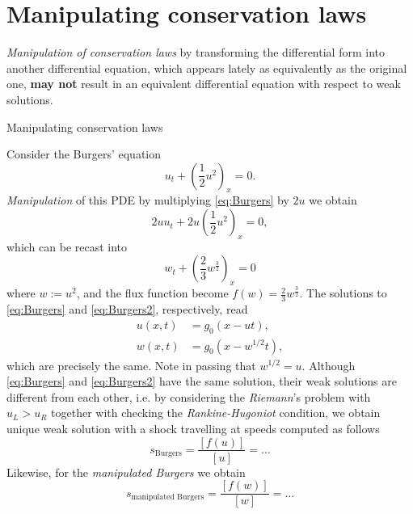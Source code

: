 \documentclass[12pt]{article}
\begin{document}
\section{Manipulating conservation laws}
\emph{Manipulation of conservation laws} by transforming the differential form into another differential equation, 
which appears lately as equivalently as the original one, \textbf{may not} result in an equivalent differential
equation with respect to weak solutions.
\begin{example}
	Manipulating conservation laws
\end{example}
Consider the Burgers' equation
\begin{equation}\label{eq:Burgers}
	u_{t} + \left(\frac{1}{2}u^2\right)_{x} = 0.
\end{equation}
\emph{Manipulation} of this PDE by multiplying \eqref{eq:Burgers} by $2u$ we obtain
\begin{equation}\label{eq:Burgers1}
	2uu_{t} + 2u\left(\frac{1}{2}u^2\right)_{x} = 0,
\end{equation}
which can be recast into
\begin{equation}\label{eq:Burgers2}
	w_{t} + \left(\frac{2}{3}w^{\frac{3}{2}}\right)_{x} = 0
\end{equation}
where $w:=u^2$, and the flux function become $\displaystyle f(w) = \frac{2}{3}w^{\frac{3}{2}}$. 
The solutions to \eqref{eq:Burgers} and \eqref{eq:Burgers2}, respectively, read
\begin{align}
	u(x,t) & = g_{0}(x-ut),       \\
	w(x,t) & = g_{0}(x-w^{1/2}t),
\end{align}
which are precisely the same. Note in passing that $w^{1/2} = u$. Although \eqref{eq:Burgers} and \eqref{eq:Burgers2}
have the same solution, their weak solutions are different from each other,
i.e. by considering the \emph{Riemann}'s problem with $u_{L}>u_{R}$
together with checking the \emph{Rankine-Hugoniot} condition, we obtain unique weak solution 
with a shock travelling at speeds computed as follows
\begin{equation}
	s_{\text{Burgers}} = \frac{[f(u)]}{[u]} = \dots
\end{equation}
Likewise, for the \emph{manipulated Burgers} we obtain
\begin{equation}
	s_{\text{manipulated Burgers}} = \frac{[f(w)]}{[w]} = \dots
\end{equation}
\clearpage
\end{document}
